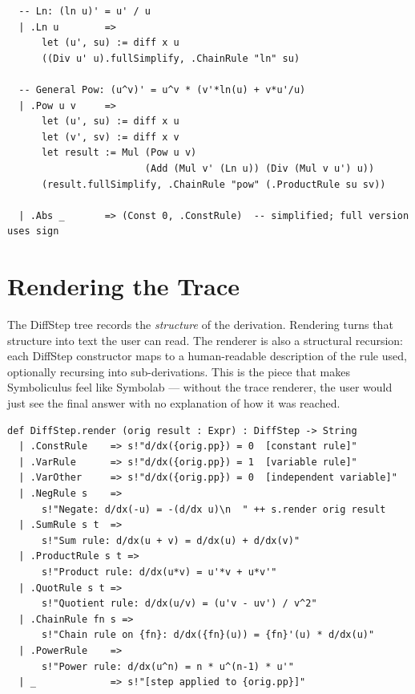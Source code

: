 \documentclass[12pt, openany]{book}
\theoremstyle{plain}
\theoremstyle{definition}
\theoremstyle{remark}
\newcommand{\li}[1]{{\ttfamily\small\color{tealaccent}#1}}
\begin{document}
\begin{leanbox}
\begin{lstlisting}
  -- Ln: (ln u)' = u' / u
  | .Ln u        =>
      let (u', su) := diff x u
      ((Div u' u).fullSimplify, .ChainRule "ln" su)

  -- General Pow: (u^v)' = u^v * (v'*ln(u) + v*u'/u)
  | .Pow u v     =>
      let (u', su) := diff x u
      let (v', sv) := diff x v
      let result := Mul (Pow u v)
                        (Add (Mul v' (Ln u)) (Div (Mul v u') u))
      (result.fullSimplify, .ChainRule "pow" (.ProductRule su sv))

  | .Abs _       => (Const 0, .ConstRule)  -- simplified; full version uses sign
\end{lstlisting}
\end{leanbox}
\color{black}

\section{Rendering the Trace}

The \li{DiffStep} tree records the \emph{structure} of the derivation.  Rendering turns that structure into text the user can read.  The renderer is also a structural recursion: each \li{DiffStep} constructor maps to a human-readable description of the rule used, optionally recursing into sub-derivations.  This is the piece that makes Symboliculus feel like Symbolab --- without the trace renderer, the user would just see the final answer with no explanation of how it was reached.

\begin{leanbox}
\begin{lstlisting}
def DiffStep.render (orig result : Expr) : DiffStep -> String
  | .ConstRule    => s!"d/dx({orig.pp}) = 0  [constant rule]"
  | .VarRule      => s!"d/dx({orig.pp}) = 1  [variable rule]"
  | .VarOther     => s!"d/dx({orig.pp}) = 0  [independent variable]"
  | .NegRule s    =>
      s!"Negate: d/dx(-u) = -(d/dx u)\n  " ++ s.render orig result
  | .SumRule s t  =>
      s!"Sum rule: d/dx(u + v) = d/dx(u) + d/dx(v)"
  | .ProductRule s t =>
      s!"Product rule: d/dx(u*v) = u'*v + u*v'"
  | .QuotRule s t =>
      s!"Quotient rule: d/dx(u/v) = (u'v - uv') / v^2"
  | .ChainRule fn s =>
      s!"Chain rule on {fn}: d/dx({fn}(u)) = {fn}'(u) * d/dx(u)"
  | .PowerRule    =>
      s!"Power rule: d/dx(u^n) = n * u^(n-1) * u'"
  | _             => s!"[step applied to {orig.pp}]"
\end{lstlisting}
\end{leanbox}
\color{black}
\end{document}
